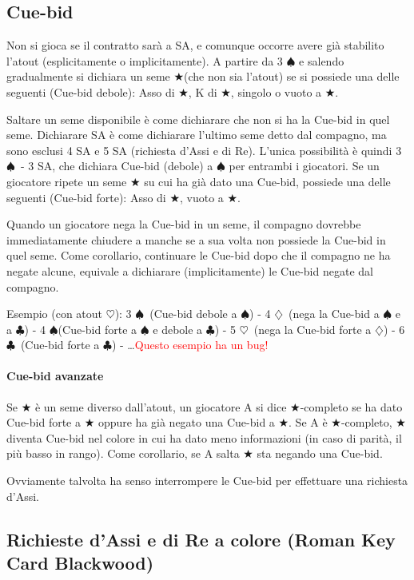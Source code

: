 \documentclass[a4paper,10pt]{article}
\renewcommand{\c}{$\clubsuit$\xspace}
\renewcommand{\d}{$\diamondsuit$\xspace}
\newcommand{\h}{$\heartsuit$\xspace}
\newcommand{\s}{$\spadesuit$\xspace}
\renewcommand{\j}{$\bigstar$\xspace}
\newcommand{\note}[1]{\textcolor{red}{#1}}
\begin{document}
\subsection{Cue-bid}

Non si gioca se il contratto sarà a SA, e comunque occorre avere già stabilito l'atout (esplicitamente o implicitamente). A partire da 3 \s e salendo gradualmente si dichiara un seme \j (che non sia l'atout) se si possiede una delle seguenti (Cue-bid debole): Asso di \j, K di \j, singolo o vuoto a \j.

Saltare un seme disponibile è come dichiarare che non si ha la Cue-bid in quel seme. Dichiarare SA è come dichiarare l'ultimo seme detto dal compagno, ma sono esclusi 4 SA e 5 SA (richiesta d'Assi e di Re). L'unica possibilità è quindi 3 \s\ - 3 SA, che dichiara Cue-bid (debole) a \s per entrambi i giocatori. Se un giocatore ripete un seme \j su cui ha già dato una Cue-bid, possiede una delle seguenti (Cue-bid forte): Asso di \j, vuoto a \j.

Quando un giocatore nega la Cue-bid in un seme, il compagno dovrebbe immediatamente chiudere a manche se a sua volta non possiede la Cue-bid in quel seme.
Come corollario, continuare le Cue-bid dopo che il compagno ne ha negate alcune, equivale a dichiarare (implicitamente) le Cue-bid negate dal compagno.

Esempio (con atout \h): 3 \s\  (Cue-bid debole a \s) - 4 \d\ (nega la Cue-bid a \s e a \c) - 4 \s (Cue-bid forte a \s e debole a \c) - 5 \h\ (nega la Cue-bid forte a \d) - 6 \c\ (Cue-bid forte a \c) - \dots \note{Questo esempio ha un bug!}

\paragraph{Cue-bid avanzate} Se \j è un seme diverso dall'atout, un giocatore A si dice \j-completo se ha dato Cue-bid forte a \j oppure ha già negato una Cue-bid a \j. Se A è \j-completo, \j diventa Cue-bid nel colore in cui ha dato meno informazioni (in caso di parità, il più basso in rango). Come corollario, se A salta \j sta negando una Cue-bid.
\vspace{4mm}

Ovviamente talvolta ha senso interrompere le Cue-bid per effettuare una richiesta d'Assi.


\subsection{Richieste d'Assi e di Re a colore (Roman Key Card Blackwood)}
\end{document}
